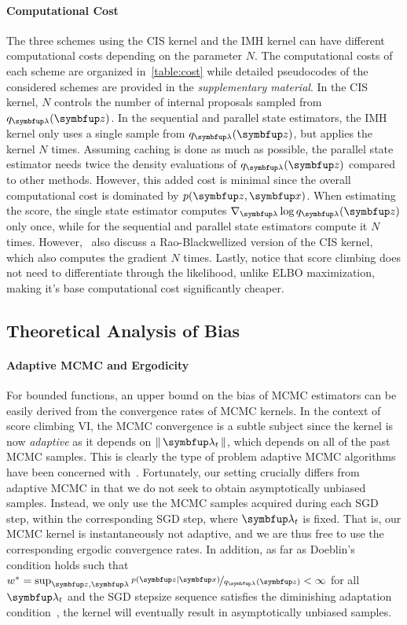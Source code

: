 \paragraph{Computational Cost}
The three schemes using the CIS kernel and the IMH kernel can have different computational costs depending on the parameter \(N\).
The computational costs of each scheme are organized in~\cref{table:cost} while detailed pseudocodes of the considered schemes are provided in the \textit{supplementary material}.
In the CIS kernel, \(N\) controls the number of internal proposals sampled from \(q_{\vlambda}(\vz)\).
In the sequential and parallel state estimators, the IMH kernel only uses a single sample from \(q_{\vlambda}(\vz)\), but applies the kernel \(N\) times.
Assuming caching is done as much as possible, the parallel state estimator needs twice the density evaluations of \(q_{\vlambda}(\vz)\) compared to other methods.
However, this added cost is minimal since the overall computational cost is dominated by  \(p(\vz,\vx)\).
When estimating the score, the single state estimator computes \(\nabla_{\vlambda} \log q_{\vlambda}(\vz)\) only once, while for the sequential and parallel state estimators compute it \(N\) times.
However,~\cite{NEURIPS2020_b2070693} also discuss a Rao-Blackwellized version of the CIS kernel, which also computes the gradient \(N\) times.
Lastly, notice that score climbing does not need to differentiate through the likelihood, unlike ELBO maximization, making it's base computational cost significantly cheaper.

\subsection{Theoretical Analysis of Bias}\label{section:theory}
\vspace{-0.05in}
\paragraph{Adaptive MCMC and Ergodicity}
For bounded functions, an upper bound on the bias of MCMC estimators can be easily derived from the convergence rates of MCMC kernels.
In the context of score climbing VI, the MCMC convergence is a subtle subject since the kernel is now \textit{adaptive} as it depends on \(\norm{\vlambda_t}\), which depends on all of the past MCMC samples.
This is clearly the type of problem adaptive MCMC algorithms have been concerned with~\citep{andrieu_ergodicity_2006}.
Fortunately, our setting crucially differs from adaptive MCMC in that we do not seek to obtain asymptotically unbiased samples.
Instead, we only use the MCMC samples acquired during each SGD step, within the corresponding SGD step, where \(\vlambda_t\) is fixed.
That is, our MCMC kernel is instantaneously not adaptive, and we are thus free to use the corresponding ergodic convergence rates.
In addition, as far as Doeblin's condition holds such that \(w^* = \sup_{\vz, \vlambda} \nicefrac{p\left(\vz\mid\vx\right)}{q_{\vlambda}\left(\vz\right)}  < \infty\) for all \(\vlambda_t\) and the SGD stepsize sequence satisfies the diminishing adaptation condition~\citep{10.2307/27595854}, the kernel will eventually result in asymptotically unbiased samples.

